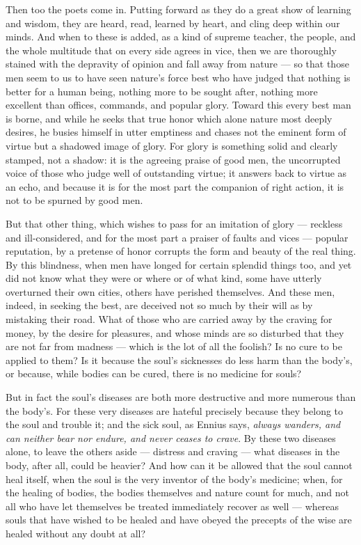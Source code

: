  Then too the poets come in. Putting forward as they do a great show of learning and wisdom, they are heard, read, learned by heart, and cling deep within our minds. And when to these is added, as a kind of supreme teacher, the people, and the whole multitude that on every side agrees in vice, then we are thoroughly stained with the depravity of opinion and fall away from nature — so that those men seem to us to have seen nature's force best who have judged that nothing is better for a human being, nothing more to be sought after, nothing more excellent than offices, commands, and popular glory. Toward this every best man is borne, and while he seeks that true honor which alone nature most deeply desires, he busies himself in utter emptiness and chases not the eminent form of virtue but a shadowed image of glory. For glory is something solid and clearly stamped, not a shadow: it is the agreeing praise of good men, the uncorrupted voice of those who judge well of outstanding virtue; it answers back to virtue as an echo, and because it is for the most part the companion of right action, it is not to be spurned by good men.

 But that other thing, which wishes to pass for an imitation of glory — reckless and ill-considered, and for the most part a praiser of faults and vices — popular reputation, by a pretense of honor corrupts the form and beauty of the real thing. By this blindness, when men have longed for certain splendid things too, and yet did not know what they were or where or of what kind, some have utterly overturned their own cities, others have perished themselves. And these men, indeed, in seeking the best, are deceived not so much by their will as by mistaking their road. What of those who are carried away by the craving for money, by the desire for pleasures, and whose minds are so disturbed that they are not far from madness — which is the lot of all the foolish? Is no cure to be applied to them? Is it because the soul's sicknesses do less harm than the body's, or because, while bodies can be cured, there is no medicine for souls?

 But in fact the soul's diseases are both more destructive and more numerous than the body's. For these very diseases are hateful precisely because they belong to the soul and trouble it; and the sick soul, as Ennius says, \textit{always wanders, and can neither bear nor endure, and never ceases to crave}. By these two diseases alone, to leave the others aside — distress and craving — what diseases in the body, after all, could be heavier? And how can it be allowed that the soul cannot heal itself, when the soul is the very inventor of the body's medicine; when, for the healing of bodies, the bodies themselves and nature count for much, and not all who have let themselves be treated immediately recover as well — whereas souls that have wished to be healed and have obeyed the precepts of the wise are healed without any doubt at all?

